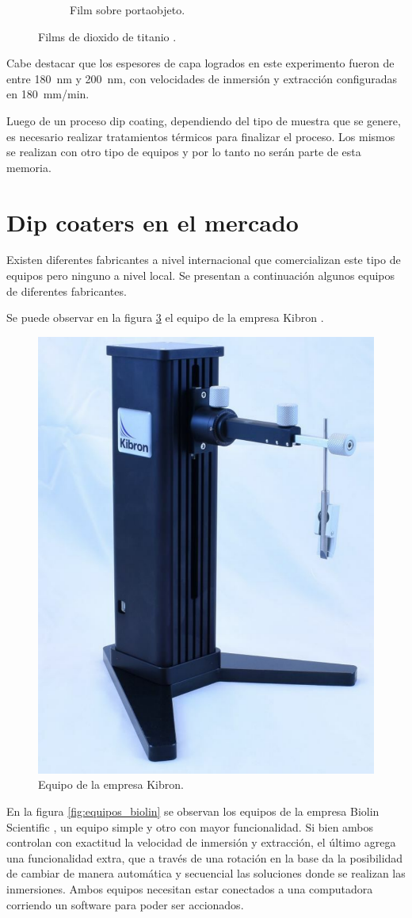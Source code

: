 \begin{figure}[!htpb]
\begin{subfigure}[b]{0.4\textwidth}
         \caption{Film sobre portaobjeto.}
         \label{fig:muestra_"}
     \end{subfigure}
     \hfill
        \caption{Films de dioxido de titanio  \protect\footnotemark.}
        \label{fig:muestras}
\end{figure}



Cabe destacar que los espesores de capa logrados en este experimento fueron de entre \SI{180}{nm} y \SI{200}{nm}, con velocidades de inmersión y extracción configuradas en \SI{180}{mm/min}.

Luego de un proceso dip coating, dependiendo del tipo de muestra que se genere, es necesario realizar tratamientos térmicos para finalizar el proceso. Los mismos se realizan con otro tipo de equipos y por lo tanto no serán parte de esta memoria.
 
\label{sec:dip coating}

\section{Dip coaters en el mercado}
\label{sec:mercado}
Existen diferentes fabricantes a nivel internacional que comercializan este tipo de equipos pero ninguno a nivel local. Se presentan a continuación algunos equipos de diferentes fabricantes. 

Se puede observar en la figura \ref{fig:dip_kibron} el equipo de la empresa Kibron \citep{2_web_kibron}.

\begin{figure}[htbp]
	\centering
	\includegraphics[width=.25\textwidth]{./Figures/kibron.pdf}
	\caption{Equipo de la empresa Kibron.}
	\label{fig:dip_kibron}
\end{figure}

En la figura \ref{fig:equipos_biolin} se observan los equipos de la empresa Biolin Scientific  \citep{1_web_biolin}, un equipo simple y otro con mayor funcionalidad. Si bien ambos controlan con exactitud la velocidad de inmersión y extracción, el último agrega una funcionalidad extra, que a través de una rotación en la base da la posibilidad de cambiar de manera automática y secuencial las soluciones donde se realizan las inmersiones. Ambos equipos necesitan estar conectados a una computadora corriendo un software para poder ser accionados.

